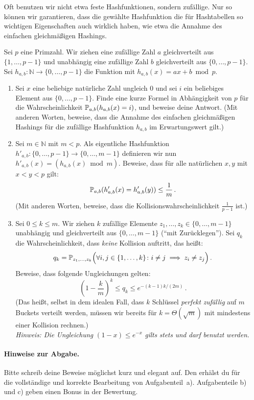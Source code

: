 \documentclass{uebung_cs}
\begin{document}
Oft benutzen wir nicht etwa feste Hashfunktionen, sondern zufällige.
Nur so können wir garantieren, dass die gewählte Hashfunktion die für Hashtabellen so wichtigen Eigenschaften auch wirklich haben, wie etwa die Annahme des einfachen gleichmäßigen Hashings.

Sei $p$ eine Primzahl.
Wir ziehen eine zufällige Zahl $a$ gleichverteilt aus $\{1,\dots,p-1\}$ und unabhängig eine zufällige Zahl $b$ gleichverteilt aus $\{0,\dots,p-1\}$.
Sei $h_{a,b}\colon\mathbb N\to\{0,\dots,p-1\}$ die Funktion mit $h_{a,b}(x)=ax+b\bmod p$.

\begin{enumerate}
    \item Sei $x$ eine beliebige natürliche Zahl ungleich $0$ und sei $i$ ein beliebiges Element aus $\{0,\dots,p-1\}$.
    Finde eine kurze Formel in Abhängigkeit von $p$ für die Wahrscheinlichkeit $\mathbb P_{a,b}(h_{a,b}(x)=i)$, und beweise deine Antwort. (Mit anderen Worten, beweise, dass die Annahme des einfachen gleichmäßigen Hashings für die zufällige Hashfunktion $h_{a,b}$ im Erwartungswert gilt.)
    \item Sei $m\in\mathbb N$ mit $m<p$.
    Als eigentliche Hashfunktion $h'_{a,b}\colon\{0,\dots,p-1\}\to\{0,\dots,m-1\}$ definieren wir nun $h'_{a,b}(x)=(h_{a,b}(x) \bmod m)$.
    Beweise, dass für alle natürlichen $x,y$ mit $x<y<p$ gilt:
    \[\mathbb P_{a,b}(h'_{a,b}(x)=h'_{a,b}(y))\le\frac{1}{m}\,.\]
    (Mit anderen Worten, beweise, dass die Kollisionswahrscheinlichkeit $\frac{1}{p-1}$ ist.)
    \item Sei $0\le k\le m$. Wir ziehen $k$ zufällige Elemente $z_1,\dots,z_k\in \{0,\dots,m-1\}$ unabhängig und gleichverteilt aus $\{0,\dots,m-1\}$ (``mit Zurücklegen''). Sei $q_k$ die Wahrscheinlichkeit, dass \emph{keine} Kollision auftritt, das heißt:
    \[q_k=\mathbb P_{z_1,\dots,z_k}\Big(\forall i,j\in \{1,\dots,k\}\colon i\ne j \implies z_i\ne z_j\Big)\,.\]
    Beweise, dass folgende Ungleichungen gelten:
    \[
        \left(1-\frac{k}{m}\right)^k\le q_k \leq e^{-(k-1)k/(2m)}\,.
    \]
    (Das heißt, selbst in dem idealen Fall, dass $k$ Schlüssel \emph{perfekt zufällig} auf $m$ Buckets verteilt werden, müssen wir bereits für $k=\Theta(\sqrt{m})$ mit mindestens einer Kollision rechnen.)\\
    \emph{Hinweis: Die Ungleichung $(1-x)\le e^{-x}$ gilts stets und darf benutzt werden.}
\end{enumerate}

\paragraph*{Hinweise zur Abgabe.}
Bitte schreib deine Beweise möglichst kurz und elegant auf.
Den  erhälst du für die vollständige und korrekte Bearbeitung von Aufgabenteil~a). Aufgabenteile b) und c) geben einen Bonus in der Bewertung.
\end{document}
